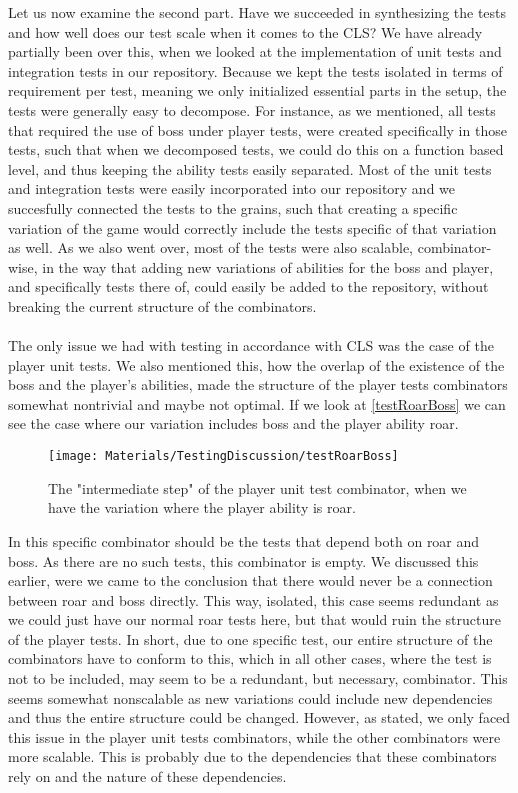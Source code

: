 Let us now examine the second part. Have we succeeded in synthesizing the tests and how well does our test scale when it comes to the CLS? We have already partially been over this, when we looked at the implementation of unit tests and integration tests in our repository. Because we kept the tests isolated in terms of requirement per test, meaning we only initialized essential parts in the setup, the tests were generally easy to decompose. For instance, as we mentioned, all tests that required the use of boss under player tests, were created specifically in those tests, such that when we decomposed tests, we could do this on a function based level, and thus keeping the ability tests easily separated. Most of the unit tests and integration tests were easily incorporated into our repository and we succesfully connected the tests to the grains, such that creating a specific variation of the game would correctly include the tests specific of that variation as well. As we also went over, most of the tests were also scalable, combinator-wise, in the way that adding new variations of abilities for the boss and player, and specifically tests there of, could easily be added to the repository, without breaking the current structure of the combinators. \\
\\
The only issue we had with testing in accordance with CLS was the case of the player unit tests. We also mentioned this, how the overlap of the existence of the boss and the player's abilities, made the structure of the player tests combinators somewhat nontrivial and maybe not optimal. If we look at \autoref{testRoarBoss} we can see the case where our variation includes boss and the player ability roar.
\begin{figure}[]
    \centering
    \texttt{[image: Materials/TestingDiscussion/testRoarBoss]}
    \caption{The "intermediate step" of the player unit test combinator, when we have the variation where the player ability is roar.}
    \label{testRoarBoss}
\end{figure} 
In this specific combinator should be the tests that depend both on roar and boss. As there are no such tests, this combinator is empty. We discussed this earlier, were we came to the conclusion that there would never be a connection between roar and boss directly. This way, isolated, this case seems redundant as we could just have our normal roar tests here, but that would ruin the structure of the player tests. In short, due to one specific test, our entire structure of the combinators have to conform to this, which in all other cases, where the test is not to be included, may seem to be a redundant, but necessary, combinator. This seems somewhat nonscalable as new variations could include new dependencies and thus the entire structure could be changed. However, as stated, we only faced this issue in the player unit tests combinators, while the other combinators were more scalable. This is probably due to the dependencies that these combinators rely on and the nature of these dependencies.\\
